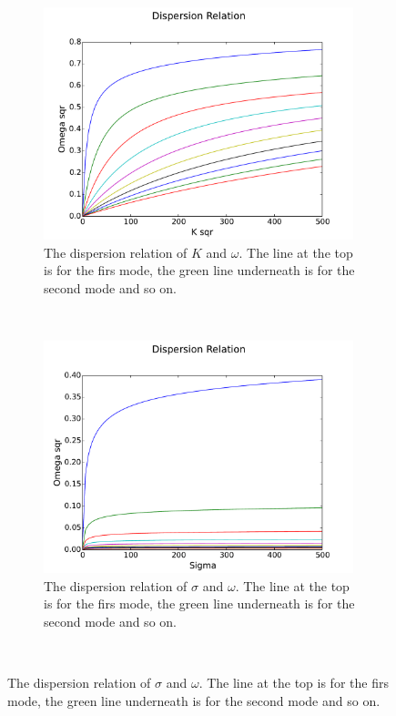 \begin{figure}[h!]
        \centering
        \begin{subfigure}[b]{0.49\textwidth}
                \includegraphics[width=9cm]{../src/plot/DispersionK}
\caption{The dispersion relation of $ K $ and $ \omega $. The line at the top is for the firs mode, the green line underneath is for the second mode and so on. }
                \label{fig:gull}
        \end{subfigure}%
        ~ %
        \begin{subfigure}[b]{0.49\textwidth}
                \includegraphics[width=9cm]{../src/plot/DispersionSigma}
\caption{The dispersion relation of $ \sigma $ and $ \omega $. The line at the top is for the firs mode, the green line underneath is for the second mode and so on.}
                \label{fig:tiger}
        \end{subfigure}\\
        

\end{figure}

